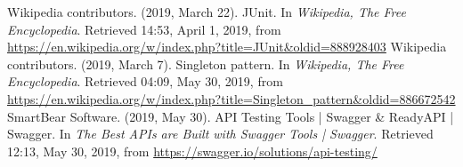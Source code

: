 \documentclass[a4paper]{report}
\begin{document}
\begin{thebibliography}{A}


Wikipedia contributors. (2019, March 22). JUnit. In \emph{Wikipedia, The Free Encyclopedia}. Retrieved 14:53, April 1, 2019, from \url{https://en.wikipedia.org/w/index.php?title=JUnit&oldid=888928403}
Wikipedia contributors. (2019, March 7). Singleton pattern. In \emph{Wikipedia, The Free Encyclopedia}. Retrieved 04:09, May 30, 2019, from \url{https://en.wikipedia.org/w/index.php?title=Singleton_pattern&oldid=886672542}
SmartBear Software. (2019, May 30). API Testing Tools | Swagger \& ReadyAPI  | Swagger. In \emph{The Best APIs are Built with Swagger Tools | Swagger}. Retrieved 12:13, May 30, 2019, from \url{https://swagger.io/solutions/api-testing/}

\end{thebibliography}
\end{document}
